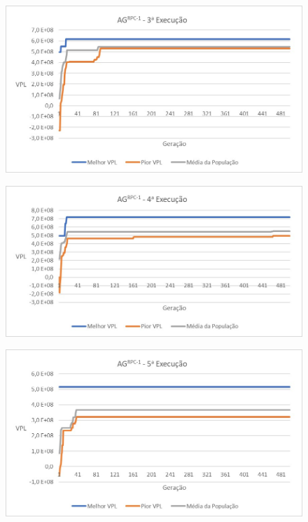 \documentclass[12pt,a4paper]{report}
\begin{document}
\begin{figure}[H]
\centering

\includegraphics[scale=1]{AGRPC/3}
\end{figure}

\begin{figure}[H]
\centering

\includegraphics[scale=1]{AGRPC/4}
\end{figure}

\begin{figure}[H]
\centering

\includegraphics[scale=1]{AGRPC/5}
\end{figure}
\end{document}

